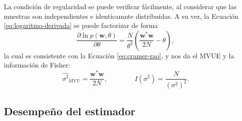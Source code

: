 La condición de regularidad se puede verificar fácilmente, al considerar que las muestras son independientes e identicamnte distribuidas. A su vez, la Ecuación \ref{eq:logaritmo-derivada} se puede factorizar de forma
\begin{equation}\label{eq:logaritmo-derivada-factorizacion}
    \frac{\partial \ln p(\mathbf{w},\theta)}{\partial \theta} =  \frac{N}{\theta^2}\left(\frac{\mathbf{w}^\ast\mathbf{w}}{2N}-\theta\right),
\end{equation}
la cual es consistente con la Ecuación \ref{eq:cramer-rao}, y nos da el MVUE y la información de Fisher:
\begin{equation}\label{eq:expresion-mvue}
    \widehat{\sigma^2}_{\text{MVU}} = \frac{\mathbf{w}^\ast\mathbf{w}}{2N}, \qquad\qquad I(\sigma^2) = \frac{N}{\left(\sigma^2\right)^2}.
\end{equation}

\subsection{Desempeño del estimador}
\label{Ss:estimador-ruido-desempeño}

 
